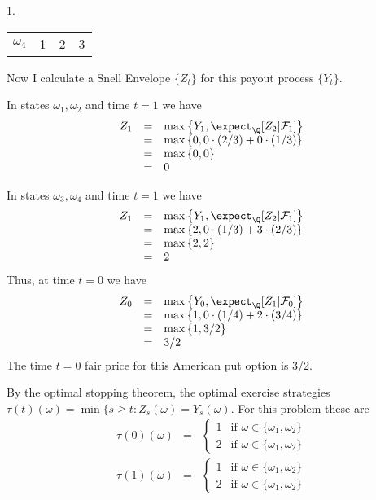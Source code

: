 \documentclass[11pt,a4paper]{article}
\begin{document}
\begin{answer}{1.}
\begin{center}
\begin{tabular}{c|ccc}
        $\omega_4$&1&2&3
    \end{tabular}
  \end{center}
  Now I calculate a Snell Envelope $\{Z_t\}$ for this payout process $\{Y_t\}$.
  \par In states $\omega_1,\omega_2$ and time $t=1$ we have
  \[\begin{array}{rcl}
    Z_1&=&\max\left\{Y_1,\expect_\Q[Z_2|\mathcal{F}_1]\right\}\\
    &=&\max\left\{0,0\cdot(2/3)+0\cdot(1/3)\right\}\\
    &=&\max\left\{0,0\right\}\\
    &=&0
  \end{array}\]
  \par In states $\omega_3,\omega_4$ and time $t=1$ we have
  \[\begin{array}{rcl}
    Z_1&=&\max\left\{Y_1,\expect_\Q[Z_2|\mathcal{F}_1]\right\}\\
    &=&\max\left\{2,0\cdot(1/3)+3\cdot(2/3)\right\}\\
    &=&\max\left\{2,2\right\}\\
    &=&2
  \end{array}\]
  Thus, at time $t=0$ we have
  \[\begin{array}{rcl}
    Z_0&=&\max\left\{Y_0,\expect_\Q[Z_1|\mathcal{F}_0]\right\}\\
    &=&\max\left\{1,0\cdot(1/4)+2\cdot(3/4)\right\}\\
    &=&\max\left\{1,3/2\right\}\\
    &=&3/2
  \end{array}\]
  The time $t=0$ fair price for this American put option is 3/2.
  \vspace{.3cm}
  \par By the optimal stopping theorem, the optimal exercise strategies $\tau(t)(\omega)=\min\{s\geq t:Z_s(\omega)=Y_s(\omega)$. For this problem these are
  \[\begin{array}{rcl}
    \tau(0)(\omega)&=&\begin{cases}
      1&\text{if }\omega\in\{\omega_1,\omega_2\}\\
      2&\text{if }\omega\in\{\omega_1,\omega_2\}
    \end{cases}\\
    \tau(1)(\omega)&=&\begin{cases}
      1&\text{if }\omega\in\{\omega_1,\omega_2\}\\
      2&\text{if }\omega\in\{\omega_1,\omega_2\}
    \end{cases}\\

\end{array}\]
\end{answer}
\end{document}

